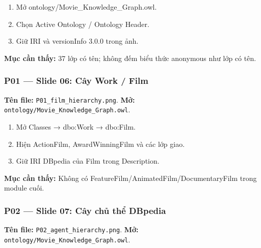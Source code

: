 \documentclass[
  11pt,
]{article}
\providecommand{\tightlist}{%
  \setlength{\itemsep}{0pt}\setlength{\parskip}{0pt}}
\begin{document}
\begin{enumerate}
\def\labelenumi{\arabic{enumi}.}
\tightlist
\item
  Mở
  ontology\allowbreak{}/\allowbreak{}\allowbreak{}Movie\_\allowbreak{}\allowbreak{}K\allowbreak{}nowledge\allowbreak{}\_\allowbreak{}\allowbreak{}Graph.\allowbreak{}o\allowbreak{}wl.\allowbreak{}
\item
  Chọn Active Ontology / Ontology Header.
\item
  Giữ IRI và versionInfo 3.0.0 trong ảnh.
\end{enumerate}

\textbf{Mục cần thấy:} 37 lớp có tên; không đếm biểu thức anonymous như
lớp có tên.

\subsubsection{P01 --- Slide 06: Cây Work /
Film}\label{p01-slide-06-cuxe2y-work-film}

\textbf{Tên file:}
\texttt{P01\_\allowbreak{}film\allowbreak{}\_\allowbreak{}hierarc\allowbreak{}hy.\allowbreak{}png}.
\textbf{Mở:}
\texttt{ontology\allowbreak{}/\allowbreak{}\allowbreak{}Movie\_\allowbreak{}\allowbreak{}K\allowbreak{}nowledge\allowbreak{}\_\allowbreak{}\allowbreak{}Graph.\allowbreak{}o\allowbreak{}wl}.

\begin{enumerate}
\def\labelenumi{\arabic{enumi}.}
\tightlist
\item
  Mở Classes → dbo:Work → dbo:Film.
\item
  Hiện ActionFilm,
  Award\allowbreak{}Win\allowbreak{}ning\allowbreak{}Film\allowbreak{}
  và các lớp giao.
\item
  Giữ IRI DBpedia của Film trong Description.
\end{enumerate}

\textbf{Mục cần thấy:} Không có
Feature\allowbreak{}F\allowbreak{}ilm/\allowbreak{}\allowbreak{}Anim\allowbreak{}ated\allowbreak{}Film\allowbreak{}/\allowbreak{}\allowbreak{}Documen\allowbreak{}tary\allowbreak{}Film\allowbreak{}
trong module cuối.

\subsubsection{P02 --- Slide 07: Cây chủ thể
DBpedia}\label{p02-slide-07-cuxe2y-chux1ee7-thux1ec3-dbpedia}

\textbf{Tên file:}
\texttt{P02\_\allowbreak{}agen\allowbreak{}t\_\allowbreak{}hierar\allowbreak{}chy.\allowbreak{}png}.
\textbf{Mở:}
\texttt{ontology\allowbreak{}/\allowbreak{}\allowbreak{}Movie\_\allowbreak{}\allowbreak{}K\allowbreak{}nowledge\allowbreak{}\_\allowbreak{}\allowbreak{}Graph.\allowbreak{}o\allowbreak{}wl}.
\end{document}
